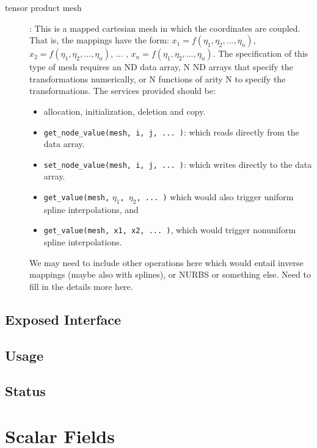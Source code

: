\documentclass[]{report}   %
\begin{document}
\begin{description}
\item[tensor product mesh]: This is a mapped cartesian mesh in which the coordinates are coupled. That is, the mappings have the form: $x_1=f(\eta_1, \eta_2, ..., \eta_n)$, $x_2=f(\eta_1,\eta_2, ..., \eta_n)$, ... , $x_n=f(\eta_1,\eta_2, ..., \eta_n)$. The specification of this type of mesh requires an ND data array, N ND arrays that specify the transformations numerically, or N functions of arity N to specify the transformations. The services provided should be:
\begin{itemize}
\item allocation, initialization, deletion and copy.
\item \verb+get_node_value(mesh, i, j, ... )+: which reads directly from the data array.
\item \verb+set_node_value(mesh, i, j, ... )+: which writes directly to the data array.
\item \verb+get_value(mesh,+ $\eta_1$\verb+, +$\eta_2$\verb+, ... )+ which would also trigger uniform spline interpolations, and
\item \verb+get_value(mesh, x1, x2, ... )+, which would trigger nonuniform spline interpolations.
\end{itemize}
We may need to include other operations here which would entail inverse mappings (maybe also with splines), or NURBS or something else. Need to fill in the details more here.
\end{description}


\subsection{Exposed Interface}

\subsection{Usage}

\subsection{Status}



\section{Scalar Fields}
\end{document}
